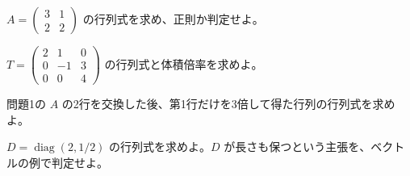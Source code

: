 \documentclass[11pt]{article}
\begin{document}

\problem[2×2の計算]
$A=\begin{pmatrix}3&1\\2&2\end{pmatrix}$ の行列式を求め、正則か判定せよ。
\workspace{38mm}

\problem[三角行列]
$T=\begin{pmatrix}2&1&0\\0&-1&3\\0&0&4\end{pmatrix}$ の行列式と体積倍率を求めよ。
\workspace{38mm}
\newpage

\problem[行操作]
問題1の $A$ の2行を交換した後、第1行だけを3倍して得た行列の行列式を求めよ。
\workspace{38mm}

\problem[面積と形]
$D=\operatorname{diag}(2,1/2)$ の行列式を求めよ。$D$ が長さも保つという主張を、ベクトルの例で判定せよ。
\workspace{38mm}
\end{document}
